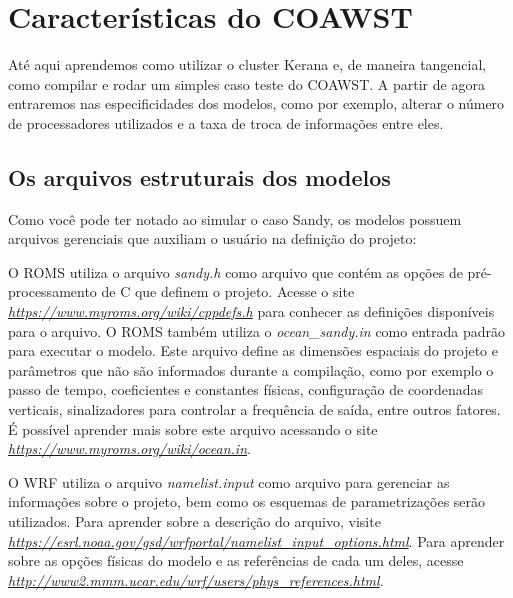 \chapter{Características do COAWST}

\noindent Até aqui aprendemos como utilizar o cluster Kerana e, de maneira tangencial, como compilar e rodar um simples caso teste do COAWST. A partir de agora entraremos nas especificidades dos modelos, como por exemplo, alterar o número de processadores utilizados e a taxa de troca de informações entre eles.
\bigskip

\section{Os arquivos estruturais dos modelos}
\bigskip

\noindent Como você pode ter notado ao simular o caso Sandy, os modelos possuem arquivos gerenciais que auxiliam o usuário na definição do projeto:
\bigskip

\noindent O ROMS utiliza o arquivo \textit{sandy.h} como arquivo que contém as opções de pré-processamento de C que definem o projeto. Acesse o site \textcolor{bleu_cite}{\href{https://www.myroms.org/wiki/cppdefs.h}{\textit{https://www.myroms.org/wiki/cppdefs.h}}} para conhecer as definições disponíveis para o arquivo. O ROMS também utiliza o \textit{ocean\_sandy.in} como entrada padrão para executar o modelo. Este arquivo define as dimensões espaciais do projeto e parâmetros que não são informados durante a compilação, como por exemplo o passo de tempo, coeficientes e constantes físicas, configuração de coordenadas verticais, sinalizadores para controlar a frequência de saída, entre outros fatores. É possível aprender mais sobre este arquivo acessando o site \textcolor{bleu_cite}{\href{https://www.myroms.org/wiki/ocean.in}{\textit{https://www.myroms.org/wiki/ocean.in}}}.
\bigskip

\noindent O WRF utiliza o arquivo \textit{namelist.input} como arquivo para gerenciar as informações sobre o projeto, bem como os esquemas de parametrizações serão utilizados. Para aprender sobre a descrição do arquivo, visite \textcolor{bleu_cite}{\href{https://esrl.noaa.gov/gsd/wrfportal/namelist\_input\_options.html}{\textit{https://esrl.noaa.gov/gsd/wrfportal/namelist\_input\_options.html}}}. Para aprender sobre as opções físicas do modelo e as referências de cada um deles, acesse  \textcolor{bleu_cite}{\href{http://www2.mmm.ucar.edu/wrf/users/phys\_references.html}{\textit{http://www2.mmm.ucar.edu/wrf/users/phys\_references.html}}}.
\bigskip

